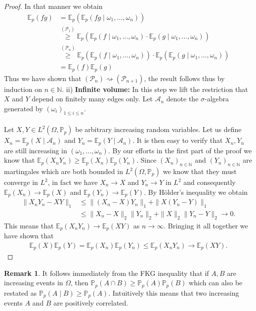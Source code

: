 \documentclass[12pt,a4paper]{article}
\theoremstyle{definition}
\newtheorem{rem}{Remark}[section]
\begin{document}
\begin{proof}
In that manner we obtain 
\begin{align*}
\mathbb{E}_p(fg) &= \mathbb{E}_p(\mathbb{E}_p( fg \mid \omega_1, \dots , \omega_n))
\\
& \overset{(\mathcal{P}_1)}\geq \mathbb{E}_p( \mathbb{E}_p(f \mid \omega_1, \dots , \omega_n) \cdot \mathbb{E}_p( g \mid \omega_1,  \dots , \omega_n))\\
& \overset{( \mathcal{P}_n)} \geq \mathbb{E}_p( \mathbb{E}_p(f \mid \omega_1, \dots ,  \omega_n)) \cdot \mathbb{E}_p( \mathbb{E}_p ( g \mid \omega_1, \dots , \omega_n)) \\
& = \mathbb{E}_p(f) \mathbb{E}_p(g)
\end{align*}
Thus we have shown that $(\mathcal{P}_n) \rightsquigarrow ( \mathcal{P}_{n+1})$, the result follows thus by induction on $n \in \mathbb{N}$. 
\newpage
ii) \textbf{Infinite volume:} In this step we lift the restriction that $X$ and $Y$ depend on finitely many edges only. Let $\mathcal{A}_n$ denote the $\sigma$-algebra generated by $( \omega_i)_{1 \leq i \leq n}$.
\\
\\
 Let $X,Y \in L^2( \Omega, \mathbb{P}_p)$ be arbitrary increasing random variables. Let us define $X_n = \mathbb{E}_p(X \mid \mathcal{A}_n)$ and $Y_n = \mathbb{E}_p(Y \mid \mathcal{A}_n)$. It is then easy to verify that $X_n, Y_n$ are still increasing in $(\omega_1, \dots, \omega_n)$. By our efforts in the first part of the proof we know that $\mathbb{E}_p(X_nY_n) \geq \mathbb{E}_p(X_n) \mathbb{E}_p(Y_n)$. Since $(X_n)_{n \in \mathbb{N}}$ and $(Y_n)_{n \in \mathbb{N}}$ are martingales which are both bounded in $L^2( \Omega, \mathbb{P}_p)$ we know that they must converge in $L^2$, in fact we have $X_n \to X$ and $Y_n \to Y$ in $L^2$ and consequently $\mathbb{E}_p(X_n) \to \mathbb{E}_p(X)$ and $\mathbb{E}_p(Y_n) \to \mathbb{E}_p(Y)$. By Hölder's inequality we obtain
\begin{align*}
\|X_nY_n - XY\|_1 & \leq \|(X_n-X)Y_n\|_1 + \|X(Y_n-Y)\|_1 
\\ & \leq \| X_n-X\|_2 \|Y_n\|_2 + \|X\|_2 \|Y_n-Y\|_2 \to 0.
\end{align*}
This means that $\mathbb{E}_p(X_nY_n) \to \mathbb{E}_p(XY)$ as $n \to \infty$. Bringing it all together we have shown that
\begin{align*}
\mathbb{E}_p(X) \mathbb{E}_p(Y) = \mathbb{E}_p(X_n)\mathbb{E}_p(Y_n) \leq \mathbb{E}_p(X_nY_n) \to \mathbb{E}_p(XY).
\end{align*}
\end{proof}
\begin{rem} It follows immediately from the FKG inequality that if $A,B$ are increasing events in $\Omega$, then $\mathbb{P}_p(A \cap B) \geq \mathbb{P}_p(A) \mathbb{P}_p(B)$ which can also be restated as $\mathbb{P}_p(A \mid B) \geq \mathbb{P}_p(A)$. Intuitively this means that two increasing events $A$ and $B$ are positively correlated. 
\end{rem}
\end{document}
